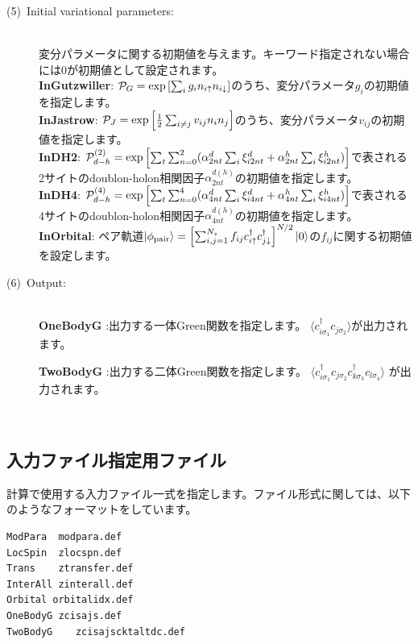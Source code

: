 \begin{description}
\item[(5)~Initial variational parameters:]
~\\ 変分パラメータに関する初期値を与えます。キーワード指定されない場合には$0$が初期値として設定されます。
~\\{\bf InGutzwiller}: ${\cal P}_G=\exp\left[ \sum_i g_i n_{i\uparrow} n_{i\downarrow} \right]$のうち、変分パラメータ$g_i$の初期値を指定します。
~\\{\bf InJastrow}: ${\cal P}_J=\exp\left[\frac{1}{2} \sum_{i\neq j} v_{ij} n_i n_j\right]$のうち、変分パラメータ$v_{ij}$の初期値を指定します。
~\\{\bf InDH2}:  ${\cal P}_{d-h}^{(2)}= \exp \left[ \sum_t \sum_{n=0}^2 (\alpha_{2nt}^d \sum_{i}\xi_{i2nt}^d+\alpha_{2nt}^h \sum_{i}\xi_{i2nt}^h)\right]$で表される2サイトのdoublon-holon相関因子$\alpha_{2nt}^{d(h)}$の初期値を指定します。
~\\{\bf InDH4}:  ${\cal P}_{d-h}^{(4)}= \exp \left[ \sum_t \sum_{n=0}^4 (\alpha_{4nt}^d \sum_{i}\xi_{i4nt}^d+\alpha_{4nt}^h \sum_{i}\xi_{i4nt}^h)\right]$で表される4サイトのdoublon-holon相関因子$\alpha_{4nt}^{d(h)}$の初期値を指定します。
~\\{\bf InOrbital}: ペア軌道$|\phi_{\rm pair} \rangle = \left[\sum_{i, j=1}^{N_s} f_{ij}c_{i\uparrow}^{\dag}c_{j\downarrow}^{\dag} \right]^{N/2}|0 \rangle$の$ f_{ij}$に関する初期値を設定します。


\item[(6)~Output:]
~\\{\bf OneBodyG }:出力する一体Green関数を指定します。
 $\langle c^{\dagger}_{i\sigma_1}c_{j\sigma_2}\rangle$が出力されます。

 {\bf TwoBodyG }:出力する二体Green関数を指定します。
 $\langle c^{\dagger}_{i\sigma_1}c_{j\sigma_2}c^{\dagger}_{k \sigma_3}c_{l\sigma_4}\rangle$
が出力されます。
\end{description}
\newpage
~\subsection{入力ファイル指定用ファイル}
\label{Subsec:InputFileList}
計算で使用する入力ファイル一式を指定します。ファイル形式に関しては、以下のようなフォーマットをしています。\\
\begin{minipage}{10cm}
\begin{screen}
\begin{verbatim}
ModPara  modpara.def
LocSpin  zlocspn.def
Trans    ztransfer.def
InterAll zinterall.def
Orbital orbitalidx.def
OneBodyG zcisajs.def
TwoBodyG	zcisajscktaltdc.def
\end{verbatim}
\end{screen}
\end{minipage}
\\
